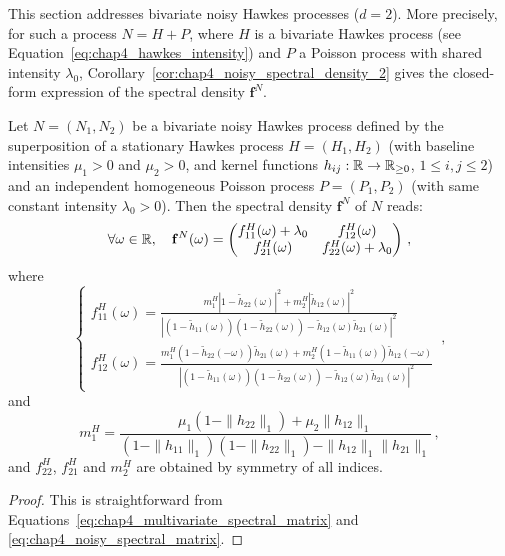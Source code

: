       This section addresses bivariate noisy Hawkes processes ($d=2$).
      More precisely, for such a process $N = H + P$, where $H$ is a bivariate Hawkes process (see Equation~\eqref{eq:chap4_hawkes_intensity}) and $P$ a Poisson process with shared intensity $\lambda_0$,
      Corollary~\ref{cor:chap4_noisy_spectral_density_2} gives the closed-form expression of the spectral density $\mathbf f^N$.
      \begin{corollary}\label{cor:chap4_noisy_spectral_density_2}
        Let $N = (N_1, N_2)$ be a bivariate noisy Hawkes process defined by the superposition of a stationary Hawkes process $H = (H_1, H_2)$
        (with baseline intensities $\mu_1 > 0$ and $\mu_2 > 0$, and kernel functions $h_{ij} : {\mathbb R} \to {\mathbb R}_{\geq 0}$, $1 \le i, j \le 2$)
        and an independent homogeneous Poisson process $P = (P_1, P_2)$ (with same constant intensity $\lambda_0 > 0$).
        Then the spectral density $\mathbf f^N$ of $N$ reads:
        \begin{equation*}
          \forall \omega \in {\mathbb R}, \quad
          \mathbf f^N(\omega) =
          \begin{pmatrix}
            f_{11}^H(\omega) + \lambda_0 & f_{12}^H(\omega) \\
            f_{21}^H(\omega) & f_{22}^H(\omega) + \lambda_0
          \end{pmatrix} \,,
        \end{equation*}
        where
        \[
          \begin{cases}
            f_{11}^H (\omega) = \frac{m_1^H \left \lvert 1 - \tilde h_{22}(\omega) \right \rvert^2 + m_2^H \left \lvert  \tilde h_{12}(\omega) \right \rvert^2}{\left \lvert \left (1-\tilde h_{11}(\omega) \right) \left (1-\tilde h_{22}(\omega) \right) - \tilde h_{12}(\omega) \tilde h_{21}(\omega) \right \rvert^2}\\
            f_{12}^H(\omega) = \frac{m_1^H \left(1-\tilde h_{22}(-\omega) \right)\tilde h_{21}(\omega) + m_2^H \left (1-\tilde h_{11}(\omega) \right) \tilde h_{12}(-\omega)}{\left \lvert \left (1-\tilde h_{11}(\omega) \right) \left (1-\tilde h_{22}(\omega) \right) - \tilde h_{12}(\omega) \tilde h_{21}(\omega) \right \rvert^2}
          \end{cases} \,,
        \]
        and
        \[
          m_1^H = \frac{\mu_1\left( 1 - \|h_{22}\|_1 \right)  + \mu_2 \|h_{12}\|_1 }{\left( 1 - \|h_{11}\|_1 \right)\left( 1 - \|h_{22}\|_1 \right) - \|h_{12}\|_1 \|h_{21}\|_1} \, ,
        \]
        and $f_{22}^H$, $f_{21}^H$ and $m_2^H$ are obtained by symmetry of all indices.
      \end{corollary}
      \begin{proof}
        This is straightforward from Equations~\eqref{eq:chap4_multivariate_spectral_matrix} and \eqref{eq:chap4_noisy_spectral_matrix}.
      \end{proof}
      
